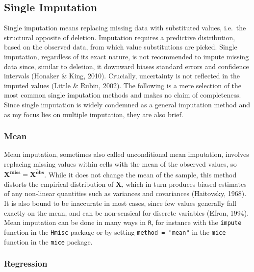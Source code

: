 \documentclass[12pt,econ]{sources/authesis}
\begin{document}
\hypertarget{ordmiss-theory-singimpute}{%
\subsection{Single Imputation}\label{ordmiss-theory-singimpute}}

Single imputation means replacing missing data with substituted values, i.e.~the structural opposite of deletion. Imputation requires a predictive distribution, based on the observed data, from which value substitutions are picked. Single imputation, regardless of its exact nature, is not recommended to impute missing data since, similar to deletion, it downward biases standard errors and confidence intervals (Honaker \& King, 2010). Crucially, uncertainty is not reflected in the imputed values (Little \& Rubin, 2002). The following is a mere selection of the most common single imputation methods and makes no claim of completeness. Since single imputation is widely condemned as a general imputation method and as my focus lies on multiple imputation, they are also brief.

\hypertarget{ordmiss-theory-impute-mean}{%
\subsubsection{Mean}\label{ordmiss-theory-impute-mean}}

Mean imputation, sometimes also called unconditional mean imputation, involves replacing missing values within cells with the mean of the observed values, so \(\bm{X^{miss}} = \bm{\overline{X^{obs}}}\). While it does not change the mean of the sample, this method distorts the empirical distribution of \(\bm{X}\), which in turn produces biased estimates of any non-linear quantities such as variances and covariances (Haitovsky, 1968). It is also bound to be inaccurate in most cases, since few values generally fall exactly on the mean, and can be non-sensical for discrete variables (Efron, 1994). Mean imputation can be done in many ways in \texttt{R}, for instance with the \texttt{impute} function in the \texttt{Hmisc} package or by setting \texttt{method\ =\ "mean"} in the \texttt{mice} function in the \texttt{mice} package.

\hypertarget{ordmiss-theory-impute-regress}{%
\subsubsection{Regression}\label{ordmiss-theory-impute-regress}}
\end{document}
